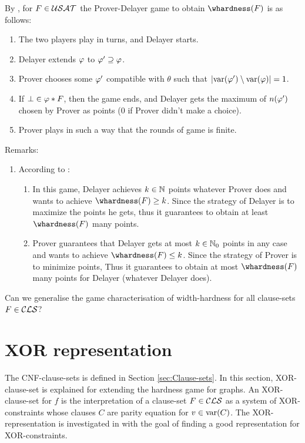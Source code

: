 \documentclass{report}
\begin{document}
\begin{lem}\label{lem:whdgame}
By \cite{BeyersdorffKullmann2014PHP}, for $F \in \mathcal{USAT}$ the Prover-Delayer game to obtain $\whardness(F)$ is as follows:

  \begin{enumerate}
  \item The two players play in turns, and Delayer starts.
  \item Delayer extends $\varphi$ to $\varphi' \supseteq \varphi$.
  \item Prover chooses some $\varphi'$ compatible with $\theta$ such that $\lvert \operatorname{var}(\varphi') \setminus \operatorname{var}(\varphi) \rvert = 1$.
  \item If $\bot \in \varphi * F$, then the game ends, and Delayer gets the maximum of $n(\varphi')$ chosen by Prover as points ($0$ if Prover didn't make a choice).
  \item Prover plays in such a way that the rounds of game is finite.
  \end{enumerate}
  \end{lem}
Remarks:
  \begin{enumerate}
  \item According to \cite{BeyersdorffKullmann2014PHP}:
  \begin{enumerate}
  \item In this game, Delayer achieves $k \in \mathbb{N}$ points whatever Prover does and wants to achieve $\whardness(F) \ge k$. Since the strategy of Delayer is to maximize the points he gets, thus it guarantees to obtain at least $\whardness(F)$ many points.
  \item Prover guarantees that Delayer gets at most $k \in \mathbb{N}_0$ points in any case and wants to achieve $\whardness(F) \le k$. Since the strategy of Prover is to minimize points, Thus it guarantees to obtain at most $\whardness(F)$ many points for Delayer (whatever Delayer does).
  \end{enumerate}
  \end{enumerate}

\begin{quest}\label{que:whdall}
Can we generalise the game characterisation of width-hardness for all clause-sets  $F \in \mathcal{CLS}$?
\end{quest}
\section{XOR representation}
\label{sec:XOR representation}

The CNF-clause-sets is defined in Section \ref{sec:Clause-sets}. In this section, XOR-clause-set is explained for extending the hardness game for graphs. An XOR-clause-set for $f$ is the interpretation of a clause-set $F \in \mathcal{CLS}$ as a system of XOR-constraints whose clauses $C$ are parity equation for $v \in \operatorname{var}(C)$. The XOR-representation is investigated in \cite{GwynneKullmann2013GoodRepresentations,GwynneKullmann2013GoodRepresentationsIIex,GwynneKullmann2013GoodRepresentationsIILata} with the goal of finding a good representation for XOR-constraints.
\end{document}
